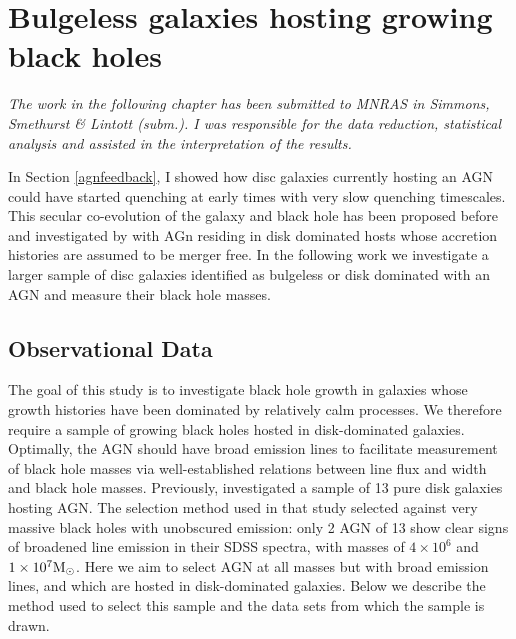 
\newpage

\section{Bulgeless galaxies hosting growing black holes}\label{intbulgeless}

\emph{The work in the following chapter has been submitted to MNRAS in Simmons, Smethurst \& Lintott (subm.). I was responsible for the data reduction, statistical analysis and assisted in the interpretation of the results.}

In Section \ref{agnfeedback}, I showed how disc galaxies currently hosting an AGN could have started quenching at early times with very slow quenching timescales. This secular co-evolution of the galaxy and black hole has been proposed before and investigated by \citet{Simmons13} with AGn residing in disk dominated hosts whose accretion histories are assumed to be merger free. In the following work we investigate a larger sample of disc galaxies identified as bulgeless or disk dominated with an AGN and measure their black hole masses. 

%
%
\subsection{Observational Data}\label{sec:data}
%
%

The goal of this study is to investigate black hole growth in galaxies whose growth histories have been dominated by relatively calm processes. We therefore require a sample of growing black holes hosted in disk-dominated galaxies. Optimally, the AGN should have broad emission lines to facilitate measurement of black hole masses via well-established relations between line flux and width and black hole masses. Previously, \citet{simmons13} investigated a sample of 13 pure disk galaxies hosting AGN. The selection method used in that study selected against very massive black holes with unobscured emission: only 2 AGN of 13 show clear signs of broadened line emission in their SDSS spectra, with masses of $4 \times 10^6$ and $1 \times 10^7 \rm{M}_{\odot} $. Here we aim to select AGN at all masses but with broad emission lines, and which are hosted in disk-dominated galaxies. Below we describe the method used to select this sample and the data sets from which the sample is drawn.

